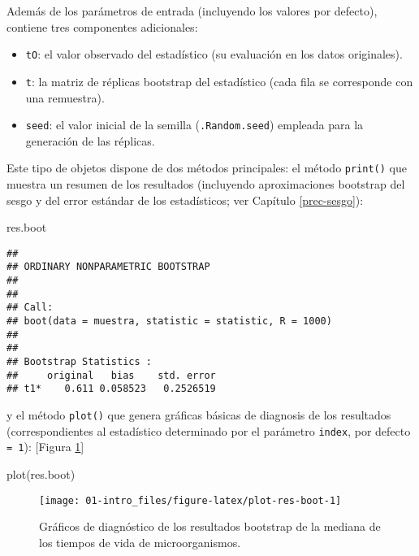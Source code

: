 \documentclass[
]{book}
\newenvironment{Shaded}{\begin{snugshade}}{\end{snugshade}}
\newcommand{\FunctionTok}[1]{\textcolor[rgb]{0.00,0.00,0.00}{#1}}
\newcommand{\NormalTok}[1]{#1}
\theoremstyle{break}
\theoremstyle{definition}
\theoremstyle{definition}
\theoremstyle{definition}
\theoremstyle{definition}
\theoremstyle{remark}
\begin{document}
Además de los parámetros de entrada (incluyendo los valores por defecto), contiene tres componentes adicionales:

\begin{itemize}
\item
  \texttt{tO}: el valor observado del estadístico
  (su evaluación en los datos originales).
\item
  \texttt{t}: la matriz de réplicas bootstrap del estadístico
  (cada fila se corresponde con una remuestra).
\item
  \texttt{seed}: el valor inicial de la semilla (\texttt{.Random.seed})
  empleada para la generación de las réplicas.
\end{itemize}

Este tipo de objetos dispone de dos métodos principales:
el método \texttt{print()} que muestra un resumen de los resultados
(incluyendo aproximaciones bootstrap del sesgo y del error
estándar de los estadísticos; ver Capítulo \ref{prec-sesgo}):

\begin{Shaded}
\begin{Highlighting}[]
\NormalTok{res.boot}
\end{Highlighting}
\end{Shaded}

\begin{verbatim}
## 
## ORDINARY NONPARAMETRIC BOOTSTRAP
## 
## 
## Call:
## boot(data = muestra, statistic = statistic, R = 1000)
## 
## 
## Bootstrap Statistics :
##     original   bias    std. error
## t1*    0.611 0.058523   0.2526519
\end{verbatim}

y el método \texttt{plot()} que genera gráficas básicas de diagnosis
de los resultados (correspondientes al estadístico determinado por el parámetro \texttt{index}, por defecto \texttt{=\ 1}): {[}Figura \ref{fig:plot-res-boot}{]}

\begin{Shaded}
\begin{Highlighting}[]
\FunctionTok{plot}\NormalTok{(res.boot)}
\end{Highlighting}
\end{Shaded}

\begin{figure}[!htb]

{\centering \texttt{[image: 01-intro\_files/figure-latex/plot-res-boot-1]} 

}

\caption{Gráficos de diagnóstico de los resultados bootstrap de la mediana de los tiempos de vida de microorganismos.}\label{fig:plot-res-boot}
\end{figure}
\end{document}
